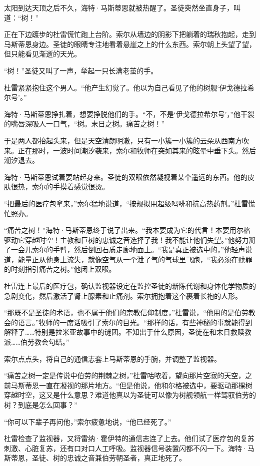 \documentclass[AutoFakeBold=true]{book}
\begin{document}
\vspace*{1em}

太阳到达天顶之后不久，海特·马斯蒂恩就被热醒了。圣徒突然坐直身子，叫道：``树！''

正在下边踱步的杜雷慌忙跑上台阶。索尔从墙边的阴影下把躺着的瑞秋抱起，走到马斯蒂恩身边。圣徒的眼睛专注地看着悬崖之上的什么东西。索尔朝上头望了望，但只能看见渐逝的天光。

``树！''圣徒又叫了一声，举起一只长满老茧的手。

杜雷紧紧抱住这个男人。``他产生幻觉了。他以为自己看见了他的树舰`伊戈德拉希尔号'。''

海特·马斯蒂恩挣扎着，想要挣脱他们的手。``不，不是`伊戈德拉希尔号'，''他干裂的嘴唇深吸人一口气，``树。末日之树。痛苦之树！''

于是两人都抬起头来，但是天空清朗明澈，只有一小簇一小簇的云朵从西南方吹来。正在那时，一波时间潮汐袭来，索尔和牧师在突如其来的眩晕中垂下头。然后潮汐退去。

海特·马斯蒂恩试着要站起身来。圣徒的双眼依然凝视着某个遥远的东西。他的皮肤很热，索尔的手摸着感觉很烫。

``把最后的医疗包拿来，''索尔猛地说道，``按规拟用超级吗啡和抗高热药剂。''杜雷慌忙照办。

``痛苦之树！''海特·马斯蒂恩终于说了出来。``我本要成为它的代言！本要用尔格驱动它穿越时空！主教和巨树的忠诚之音选择了我！我不能让他们失望。''他努力掰了一会儿索尔的手臂，然后倒回石质走廊地面上。``我是真正被选中的，''他轻声说道，能量正从他身上流失，就像空气从一个泄了气的气球里飞跑，``我必须在赎罪的时刻指引痛苦之树。''他闭上双眼。

杜雷连上最后的医疗包，确认监视器设定在监控圣徒的新陈代谢和身体化学物质的急剧变化，然后激活了肾上腺素和止痛剂。索尔拥抱着这个裹着长袍的人形。

``那既不是圣徒的术语，也不属于他们的宗教信仰制度，''杜雷说，``他用的是伯劳教会的语言。''牧师的一席话吸引了索尔的目光。``那样的话，有些神秘的事就能得到解释了……特别是拉米亚故事中的谜团。不知出于什么原因，圣徒在和末日救赎教派……伯劳教会勾结。''

索尔点点头，将自己的通信志套上马斯蒂恩的手腕，并调整了监视器。

``痛苦之树一定是传说中伯劳的荆棘之树，''杜雷咕哝着，望向那片空寂的天空，之前马斯蒂恩一直在凝视的那片地方。``但是他说，他和尔格被选中，要驱动那棵树穿越时空，这又是什么意思？难道他真以为圣徒可以像为树舰领航一样驾驭伯劳的树？到底是怎么回事？''

``你可以下辈子再问他，''索尔疲惫地说，``他已经死了。''

杜雷检查了监视器，又将雷纳·霍伊特的通信志连了上去。他们试了医疗包的复苏刺激、心脏复苏，还有口对口人工呼吸。监视器信号装置闪都不闪一下。海特·马斯蒂恩，圣徒、树的忠诚之音兼伯劳朝圣者，真正地死了。
\end{document}
